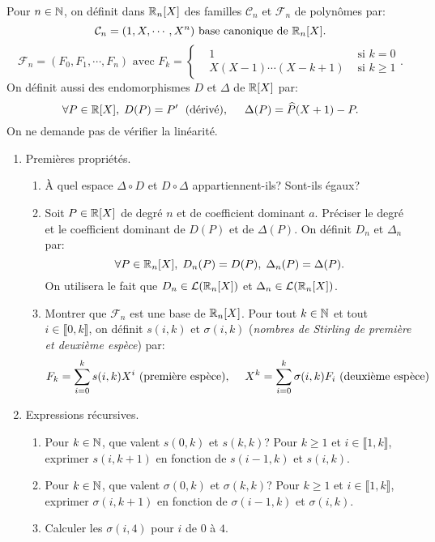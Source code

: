 Pour $n \in \mathbb{N}$, on définit dans $\mathbb{R}_n[X]$ des familles $\mathcal{C}_n$ et $\mathcal{F}_n$ de polynômes par:
\[
 \mathcal{C}_n = (1,X,\cdots,X^n) \text{ base canonique de } \mathbb{R}_n[X].
\]
\[
 \mathcal{F}_n = (F_0,F_1,\cdots,F_n) \text{ avec }
 F_k = \left\lbrace 
 \begin{aligned}
   &1 &\text{ si } k = 0\\
  &X(X-1) \cdots (X-k+1) &\text{ si } k \geq 1
 \end{aligned}
\right. .
\]
On définit aussi des endomorphismes $D$ et $\Delta$ de $\mathbb{R}[X]$ par:
\[
 \forall P\in \mathbb{R}[X], \; D(P) = P' \;\text{ (dérivé)},\hspace{0.5cm}
 \Delta(P) = \widehat{P}(X+1) - P.
\]
On ne demande pas de vérifier la linéarité.
\begin{enumerate}
 \item Premières propriétés. 
 \begin{enumerate}
 \item \`A quel espace $\Delta \circ D$ et $D \circ \Delta$ appartiennent-ils? Sont-ils égaux?
 \item Soit $P \in \mathbb{R}[X]$ de degré $n$ et de coefficient dominant $a$. Préciser le degré et le coefficient dominant de $D(P)$ et de $\Delta(P)$. \newline
 On définit $D_n$ et $\Delta_n$ par:
 \[
  \forall P \in \mathbb{R}_n[X], \; D_n(P) = D(P), \; \Delta_n(P) = \Delta(P).
 \]
On utilisera le fait que $D_n \in \mathcal{L}(\mathbb{R}_n[X])$ et $\Delta_n \in \mathcal{L}(\mathbb{R}_n[X])$.

 \item Montrer que $\mathcal{F}_n$ est une base de $\mathbb{R}_n[X]$.\newline
 Pour tout $k\in \mathbb{N}$ et tout $i\in \llbracket 0,k\rrbracket$, on définit $s(i,k)$ et $\sigma(i,k)$  (\emph{nombres de Stirling de première et deuxième espèce}) par:
\[
 F_k = \sum_{i=0}^{k}s(i,k) X^i \text{ (première espèce),} \hspace{0.5cm}
 X^k = \sum_{i=0}^{k}\sigma(i,k) F_i \text{ (deuxième espèce)}
\]
 \end{enumerate}
 
 \item Expressions récursives.
 \begin{enumerate}
  \item Pour $k\in \mathbb{N}$, que valent $s(0,k)$ et $s(k,k)$? Pour $k\geq1$ et $i\in\llbracket 1,k\rrbracket$, exprimer $s(i,k+1)$ en fonction de $s(i-1,k)$ et $s(i,k)$.
  \item Pour $k\in \mathbb{N}$, que valent $\sigma(0,k)$ et $\sigma(k,k)$? Pour $k\geq1$ et $i\in\llbracket 1,k\rrbracket$, exprimer $\sigma(i,k+1)$ en fonction de $\sigma(i-1,k)$ et $\sigma(i,k)$.
  \item Calculer les $\sigma(i,4)$ pour $i$ de $0$ à $4$.
 \end{enumerate}


\end{enumerate}
